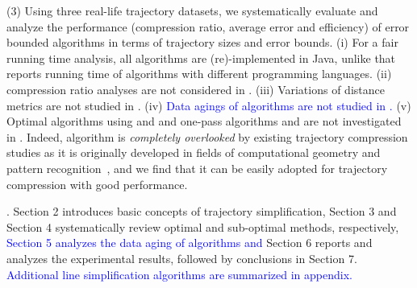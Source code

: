 \stab (3) Using three real-life trajectory datasets, we systematically evaluate and analyze the performance (compression ratio, average error and efficiency) of error bounded \lsa algorithms in terms of trajectory sizes and error bounds.
%
(i) For a fair running time analysis, all algorithms are (re)-implemented in Java, unlike \cite{Zhang:Evaluation} that reports running time of algorithms with different programming languages. (ii) compression ratio analyses are not considered in \cite{Zhang:Evaluation}.
(iii) Variations of distance metrics are not studied in \cite{Zhang:Evaluation}.
(iv) \textcolor{blue}{Data agings of \lsa algorithms are not studied in \cite{Zhang:Evaluation}.}
(v) Optimal algorithms using \ped and \sed and one-pass algorithms \siped and \cised are not investigated in \cite{Zhang:Evaluation}. Indeed, algorithm \siped is {\em completely overlooked} by existing trajectory compression studies as it is originally developed in fields of computational geometry and pattern recognition~\cite{Williams:Longest,Sklansky:Cone,Dunham:Cone, Zhao:Sleeve}, and we find that it can be easily adopted for trajectory compression with good performance.




. Section 2 introduces basic concepts of trajectory simplification,
Section 3 and Section 4 systematically review optimal and sub-optimal \lsa methods, respectively,
\textcolor{blue}{Section 5 analyzes the data aging of \lsa algorithms and}
Section 6 reports and analyzes the experimental results, followed by
conclusions in Section 7.
\textcolor{blue}{Additional line simplification algorithms are summarized in appendix.}



